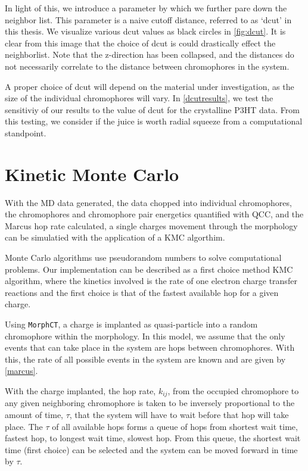 In light of this, we introduce a parameter by which we further pare down the neighbor list. This parameter is
a naive cutoff distance, referred to as `dcut' in this thesis. We visualize various dcut values as black
circles in \autoref{fig:dcut}.
It is clear from this image that the choice of dcut is could drastically effect the
neighborlist.  
Note that the z-direction has been collapsed, and the distances do not necessarily correlate to the distance
between chromophores in the system.

A proper choice of dcut will depend on the material under investigation, 
as the size of the individual chromophores will vary. In 
\autoref{dcutresults}, we test the sensitiviy of our results to the value of dcut for the crystalline P3HT
data. From this testing, we consider if the juice is worth radial squeeze from a computational standpoint. 

\section{Kinetic Monte Carlo}
\label{KMC}

With the MD data generated, the data chopped into individual chromophores, 
the chromophores and chromophore pair energetics
quantified with QCC, and the Marcus hop rate calculated, 
a single charges movement through the morphology can be simulatied with the
application of a KMC algorthim.

Monte Carlo algorithms use pseudorandom numbers to solve computational problems. Our implementation can be
described as a first choice method KMC algorithm, where the kinetics involved is the rate of one electron
charge transfer reactions and the first choice is that of the fastest available hop for a given charge.

Using \texttt{MorphCT}, a charge is implanted as quasi-particle into a random chromophore within 
the morphology. In this model, we assume that the only events that can take place in the system are hops
between chromophores. With this, the rate of all possible events in the system are known and are given by
\autoref{marcus}. 

With the charge implanted, the hop rate, $k_{ij}$, from the occupied chromophore to any
given neighboring chromophore is taken to be
inversely proportional to the amount of time, $\tau$, that the system will have to wait before that hop will
take place. The $\tau$ of all available hops forms a queue of hops from shortest wait time, fastest hop, to
longest wait time, slowest hop. From this queue, the shortest wait time (first choice) can be selected
and the system can be moved forward in time by $\tau$.


